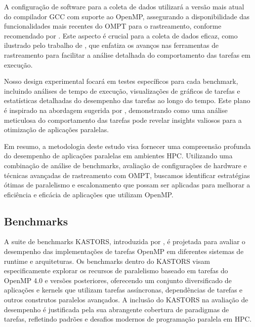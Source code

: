 \documentclass[ppgc,diss]{iiufrgs}
\begin{document}
A configuração de software para a coleta de dados utilizará a versão mais atual do compilador GCC com suporte ao OpenMP, assegurando a disponibilidade das funcionalidades mais recentes do OMPT para o rastreamento, conforme recomendado por \citet{Dagum1998OpenMP}. Este aspecto é crucial para a coleta de dados eficaz, como ilustrado pelo trabalho de \citet{Geimer2010SCALASCA}, que enfatiza os avanços nas ferramentas de rastreamento para facilitar a análise detalhada do comportamento das tarefas em execução.


Nosso design experimental focará em testes específicos para cada benchmark, incluindo análises de tempo de execução, visualizações de gráficos de tarefas e estatísticas detalhadas do desempenho das tarefas ao longo do tempo. Este plano é inspirado na abordagem sugerida por \citet{Chapman2007UsingOpenMP}, demonstrando como uma análise meticulosa do comportamento das tarefas pode revelar insights valiosos para a otimização de aplicações paralelas.


Em resumo, a metodologia deste estudo visa fornecer uma compreensão profunda do desempenho de aplicações paralelas em ambientes HPC. Utilizando uma combinação de análise de benchmarks, avaliação de configurações de hardware e técnicas avançadas de rastreamento com OMPT, buscamos identificar estratégias ótimas de paralelismo e escalonamento que possam ser aplicadas para melhorar a eficiência e eficácia de aplicações que utilizam OpenMP.

\subsection{Benchmarks}

A suite de benchmarks KASTORS, introduzida por , é projetada para avaliar o desempenho das implementações de tarefas OpenMP em diferentes sistemas de runtime e arquiteturas. Os benchmarks dentro do KASTORS visam especificamente explorar os recursos de paralelismo baseado em tarefas do OpenMP 4.0 e versões posteriores, oferecendo um conjunto diversificado de aplicações e kernels que utilizam tarefas assíncronas, dependências de tarefas e outros construtos paralelos avançados. A inclusão do KASTORS na avaliação de desempenho é justificada pela sua abrangente cobertura de paradigmas de tarefas, refletindo padrões e desafios modernos de programação paralela em HPC.
\end{document}
